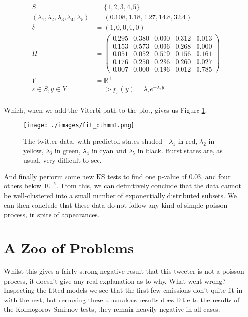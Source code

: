 \begin{align*}
S &= \{1,2,3,4,5\}\\
(\lambda_1,\lambda_2,\lambda_3,\lambda_4,\lambda_5) &= (0.108, 1.18, 4.27, 14.8, 32.4)\\
\delta &= (1,0,0,0,0)\\
\Pi &= 
\left(
    \begin{matrix}
    0.295 & 0.380 & 0.000 & 0.312 & 0.013 \\
    0.153 & 0.573 & 0.006 & 0.268 & 0.000 \\
    0.051 & 0.052 & 0.579 & 0.156 & 0.161 \\
    0.176 & 0.250 & 0.286 & 0.260 & 0.027 \\
    0.007 & 0.000 & 0.196 & 0.012 & 0.785
    \end{matrix}
\right)\\
Y &= \mathbb{R}^{+}\\
s \in S, y \in Y &=> p_s(y) = \lambda_s e^{-\lambda_sy}\\
\end{align*}

Which, when we add the Viterbi path to the plot, gives us Figure \ref{fit_dthmm1}.

\begin{figure}[h!]
\texttt{[image: ./images/fit\_dthmm1.png]}
\caption{The twitter data, with predicted states shaded - $\lambda_1$ in red, $\lambda_2$ in yellow, $\lambda_3$ in green, $\lambda_4$ in cyan and $\lambda_5$ in black. Burst states are, as usual, very difficult to see.}
\label{fit_dthmm1}
\end{figure}

And finally perform some new KS tests to find one p-value of 0.03, and four others below $10^{-7}$. From this, we can definitively conclude that the data cannot be well-clustered into a small number of exponentially distributed subsets. We can then conclude that these data do not follow any kind of simple poisson process, in spite of appearances.

\section{A Zoo of Problems}

Whilst this gives a fairly strong negative result that this tweeter is not a poisson process, it doesn't give any real explanation as to why. What went wrong? Inspecting the fitted models we see that the first few emissions don't quite fit in with the rest, but removing these anomalous results does little to the results of the Kolmogorov-Smirnov tests, they remain heavily negative in all cases.

